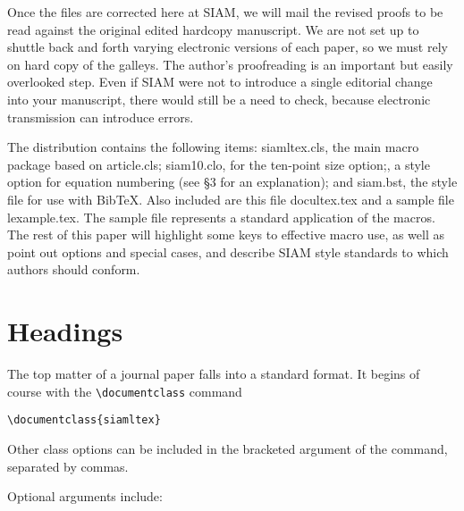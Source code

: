 \documentclass[]{article}
\begin{document}
Once the files are corrected here at SIAM, we will mail the revised
proofs to be read against the original edited hardcopy manuscript. We
are not set up to shuttle back and forth varying electronic versions of
each paper, so we must rely on hard copy of the galleys. The author's
proofreading is an important but easily overlooked step. Even if SIAM
were not to introduce a single editorial change into your manuscript,
there would still be a need to check, because electronic transmission
can introduce errors.

The distribution contains the following items: {siamltex.cls}, the main
macro package based on {article.cls}; {siam10.clo}, for the ten-point
size option;, a style option for equation numbering (see §3 for an
explanation); and {siam.bst}, the style file for use with {Bib}TeX. Also
included are this file {docultex.tex} and a sample file {lexample.tex}.
The sample file represents a standard application of the macros. The
rest of this paper will highlight some keys to effective macro use, as
well as point out options and special cases, and describe SIAM style
standards to which authors should conform.

\section{Headings}\label{headings}

The top matter of a journal paper falls into a standard format. It
begins of course with the \texttt{\textbackslash{}documentclass} command

\begin{verbatim}
\documentclass{siamltex}
\end{verbatim}

Other class options can be included in the bracketed argument of the
command, separated by commas.

Optional arguments include:
\end{document}
